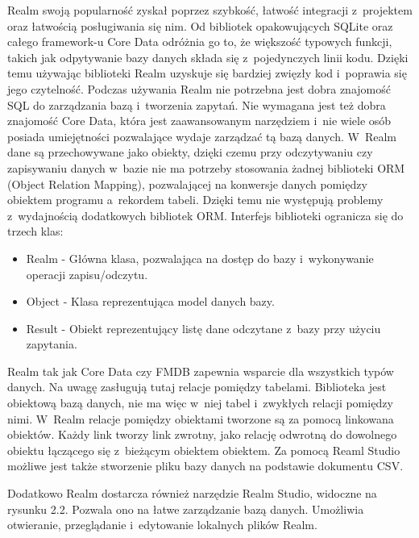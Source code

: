 Realm swoją popularność zyskał poprzez szybkość, łatwość integracji z~projektem oraz łatwością posługiwania się nim. Od bibliotek opakowujących SQLite oraz całego framework-u Core Data odróżnia go to, że większość typowych funkcji, takich jak odpytywanie bazy danych składa się z~pojedynczych linii kodu. Dzięki temu używając biblioteki Realm uzyskuje się bardziej zwięzły kod i~poprawia się jego czytelność. Podczas używania Realm nie potrzebna jest dobra znajomość SQL do zarządzania bazą i~tworzenia zapytań. Nie wymagana jest też dobra znajomość Core Data, która jest zaawansowanym narzędziem i~nie wiele osób posiada umiejętności pozwalające wydaje zarządzać tą bazą danych. W~Realm dane są przechowywane jako obiekty, dzięki czemu przy odczytywaniu czy zapisywaniu danych w~bazie nie ma potrzeby stosowania żadnej biblioteki ORM (Object Relation Mapping), pozwalającej na konwersje danych pomiędzy obiektem programu a~rekordem tabeli. Dzięki temu nie występują problemy z~wydajnością dodatkowych bibliotek ORM. Interfejs biblioteki ogranicza się do trzech klas: 

\begin{itemize}
	\item Realm -  Główna klasa, pozwalająca na dostęp do bazy i~wykonywanie operacji zapisu/odczytu.
	\item Object - Klasa reprezentująca model danych bazy.
	\item Result - Obiekt reprezentujący listę dane odczytane z~bazy przy użyciu zapytania.
\end{itemize}
 \par

Realm tak jak Core Data czy FMDB zapewnia wsparcie dla wszystkich typów danych. Na uwagę zasługują tutaj relacje pomiędzy tabelami. Biblioteka jest obiektową bazą danych, nie ma więc w~niej tabel i~zwykłych relacji pomiędzy nimi. W~Realm relacje pomiędzy obiektami tworzone są za pomocą linkowana obiektów. Każdy link tworzy link zwrotny, jako relację odwrotną do dowolnego obiektu łączącego się z~bieżącym obiektem obiektem. Za pomocą Reaml Studio możliwe jest także stworzenie pliku bazy danych na podstawie dokumentu CSV.  \par 

Dodatkowo Realm dostarcza również narzędzie Realm Studio, widoczne na rysunku 2.2. Pozwala ono na łatwe zarządzanie bazą danych. Umożliwia otwieranie, przeglądanie i~edytowanie lokalnych plików Realm.  

